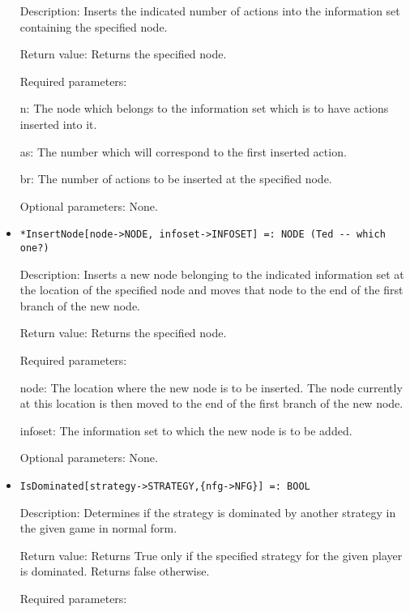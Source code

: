 \begin{itemize}
\bd
\item
[Description:] Inserts the indicated number of actions into the
information set containing the specified node.
\item
[Return value:] Returns the specified node.
\item
[Required parameters:]\hfil\null

\bd
\item
[n:] The node which belongs to the information set which is to have
actions inserted into it.
\item
[as:] The number which will correspond to the first inserted action.
\item
[br:] The number of actions to be inserted at the specified node.
\ed

\item
[Optional parameters:] None.
\ed

\item
\protect \large \begin{verbatim}
*InsertNode[node->NODE, infoset->INFOSET] =: NODE (Ted -- which one?)
\end{verbatim}\normalsize

\bd
\item
[Description:] Inserts a new node belonging to the indicated
information set at the location of the specified node and moves that
node to the end of the first branch of the new node.
\item
[Return value:] Returns the specified node.
\item
[Required parameters:]\hfil\null

\bd
\item
[node:] The location where the new node is to be inserted.  The node
currently at this location is then moved to the end of the first
branch of the new node.
\item
[infoset:] The information set to which the new node is to be added.  
\ed

\item
[Optional parameters:] None.
\ed

\item
\protect \large \begin{verbatim}
IsDominated[strategy->STRATEGY,{nfg->NFG}] =: BOOL
\end{verbatim}\normalsize

\bd
\item
[Description:] Determines if the strategy is dominated by another
strategy in the given game in normal form.
\item
[Return value:] Returns True only if the specified strategy for the
given player is dominated.  Returns false otherwise.
\item
[Required parameters:]\hfil\null


\end{itemize}
